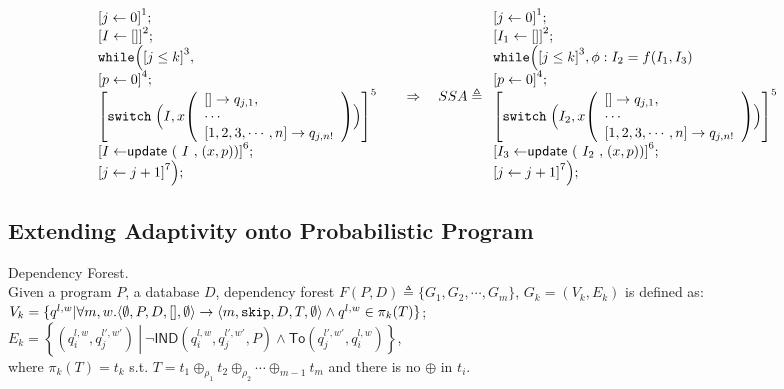 \documentclass[a4paper,11pt]{article}
\begin{document}
\[
\begin{array}{l}
     \left[j \leftarrow 0 \right]^1 ; \\
    \left[I \leftarrow [] \right]^2; \\
    \ewhile \Big( 
    \left[j \leq k \right]^3 , \\
    \left[p \leftarrow 0 \right]^4 ; \\
    \left[
    \eswitch \Big( I, x
    \left(\begin{array}{l}
        [ ] \to q_{j,1},\\
        \cdots\\
    \clabel{1, 2, 3, \cdots, n} \to q_{j,n!}
    \end{array}\right)
    \Big)
    \right]^5\\
    \clabel{I \leftarrow \eupdt(I, (x, p))}^6;\\
    \clabel{j \leftarrow j + 1 }^7
    \Big) ;
\end{array}
%
~~~~ \Rightarrow ~~~
%
SSA \triangleq
\begin{array}{l}
     \left[j \leftarrow 0 \right]^1 ; \\
    \left[I_1 \leftarrow [] \right]^2; \\
    \ewhile \Big( 
    \left[j \leq k \right]^3 , \phi: {I_2} = f({I_1}, {I_3}) \\
    \left[p \leftarrow 0 \right]^4 ; \\
    \left[
    \eswitch \Big( {I_2}, x
    \left(\begin{array}{l}
        [ ] \to q_{j,1},\\
        \cdots\\
    \clabel{1, 2, 3, \cdots, n} \to q_{j,n!}
    \end{array}\right)
    \Big)
    \right]^5\\
    \clabel{{I_3} \leftarrow \eupdt({I_2}, (x, p))}^6;\\
    \clabel{j \leftarrow j + 1 }^7
    \Big) ;
\end{array}
\]
%
%
\subsection{Extending Adaptivity onto Probabilistic Program}
%
\begin{defn}
Dependency Forest.
\\
Given a program $P$, a database $D$, 
dependency forest $F(P, D) \triangleq \{ G_1, G_2, \cdots, G_m \}$,
$G_k = (V_k, E_k)$ is defined as: 
\\
$V_k =\{q^{l,w} |\forall m, w. \langle \emptyset, P, D,[], \emptyset  \rangle \rightarrow \langle m, \mathtt{skip}, D, T, \emptyset \rangle \land q^{l,w} \in \pi_k (T)  \}$;
\\
$E_k = \left\{(q_i^{l,w},q_j^{l',w'}) 
~ \left \vert ~ \neg \mathsf{IND}(q_i^{l,w},q_j^{l',w'}, P)
\land \mathsf{To}(q_j^{l',w'}, q_i^{l,w}) \right.\right\}$,
\\
where $\pi_k (T) = t_k$ s.t. $T = t_1 \oplus_{\rho_1} t_2 \oplus_{\rho_2}
\cdots \oplus_{m - 1} t_m $ and there is no $\oplus$ in $t_i$.
\end{defn}
\end{document}
